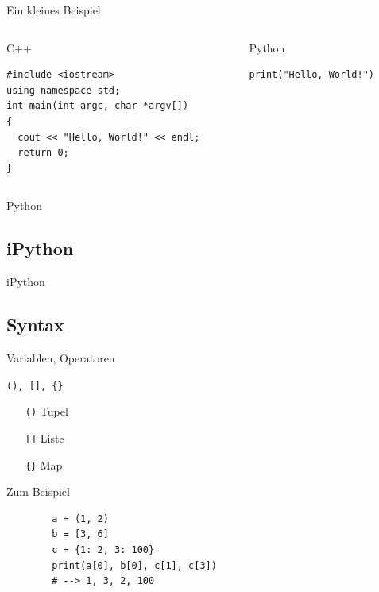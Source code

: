 \begin{frame}[fragile]{Ein kleines Beispiel}
  \begin{columns}
    \begin{column}{0.5\textwidth}
      \begin{exampleblock}{C++}
        \begin{verbatim}
#include <iostream>
using namespace std;
int main(int argc, char *argv[])
{
  cout << "Hello, World!" << endl;
  return 0;
}
        \end{verbatim}
      \end{exampleblock}
    \end{column}
    \begin{column}{0.5\textwidth}
      \begin{exampleblock}{Python}
        \begin{verbatim}
print("Hello, World!")
        \end{verbatim}
      \end{exampleblock}
    \end{column}
  \end{columns}
\end{frame}

  \begin{frame}{Python}
    \tableofcontents[sectionstyle=show/hide,
                     subsectionstyle=show/show/hide,
                     subsubsectionstyle=show/show/show]
  \end{frame}

  \subsection{iPython}
    \begin{frame}{iPython}
    \end{frame}

  \subsection{Syntax}
    \begin{frame}{Variablen, Operatoren}
    \end{frame}

\begin{frame}[fragile]{\texttt{(), [], \{\}}}
  \begin{itemize}
    \item[\texttt{()}] Tupel
    \item[\texttt{[]}] Liste
    \item[\texttt{\{\}}] Map 
  \end{itemize}
  \vspace{.5em}
  \begin{spacing}{1.0}
    \begin{exampleblock}{Zum Beispiel}
      \begin{verbatim}
        a = (1, 2)
        b = [3, 6]
        c = {1: 2, 3: 100}
        print(a[0], b[0], c[1], c[3])
        # --> 1, 3, 2, 100
      \end{verbatim}
    \end{exampleblock}
  \end{spacing}
\end{frame}

